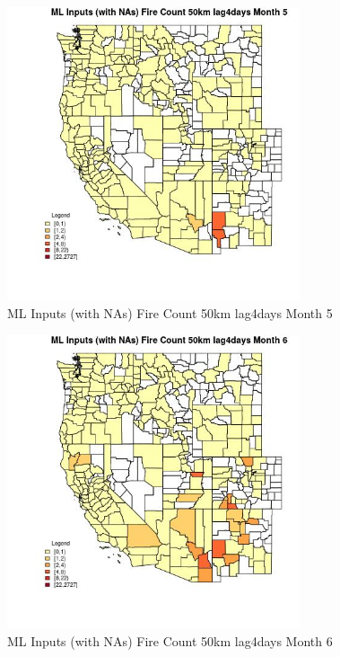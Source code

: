 \begin{figure} 
\centering  
\includegraphics[width=0.77\textwidth]{Code_Outputs/Report_ML_input_PM25_Step4_part_f_de_duplicated_aves_prioritize_24hr_obswNAs_CountyFire_Count_50km_lag4daysmedianMonth5.jpg} 
\caption{\label{fig:Report_ML_input_PM25_Step4_part_f_de_duplicated_aves_prioritize_24hr_obswNAsCountyFire_Count_50km_lag4daysmedianMonth5}ML Inputs (with NAs) Fire Count 50km lag4days Month 5} 
\end{figure} 
 

\begin{figure} 
\centering  
\includegraphics[width=0.77\textwidth]{Code_Outputs/Report_ML_input_PM25_Step4_part_f_de_duplicated_aves_prioritize_24hr_obswNAs_CountyFire_Count_50km_lag4daysmedianMonth6.jpg} 
\caption{\label{fig:Report_ML_input_PM25_Step4_part_f_de_duplicated_aves_prioritize_24hr_obswNAsCountyFire_Count_50km_lag4daysmedianMonth6}ML Inputs (with NAs) Fire Count 50km lag4days Month 6} 
\end{figure} 
 

